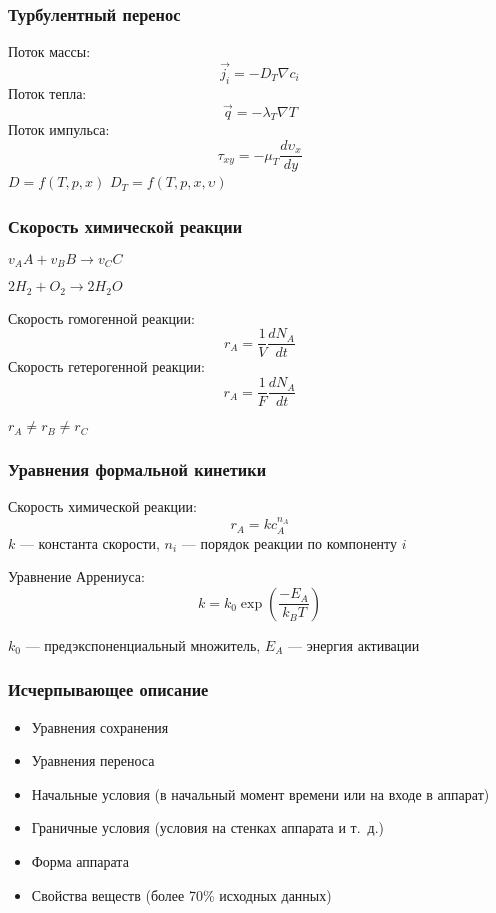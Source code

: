 \begin{frame}
	\frametitle{Турбулентный перенос}
	Поток массы:
	\begin{equation}
	\vec{j_i} = -D_{T}\nabla c_i
	\end{equation}
	Поток тепла:
	\begin{equation}
	\vec{q} = -\lambda_T \nabla T
	\end{equation}
	Поток импульса:
	\begin{equation}
	\tau_{xy} = -\mu_T \dfrac{d \upsilon_x}{d y}
	\end{equation}
	$D=f(T,p,x)$ $D_T=f(T,p,x,\upsilon)$
	
\end{frame}


\begin{frame}
\frametitle{Скорость химической реакции}
$v_A A + v_B B \rightarrow v_C C$

$2 H_2 + O_2 \rightarrow  2 H_2 O$

Скорость гомогенной реакции:
	\begin{equation}
		r_A = \dfrac{1}{V} \dfrac{d N_A}{d t}
	\end{equation}
Скорость гетерогенной реакции:
	\begin{equation}
		r_A = \dfrac{1}{F} \dfrac{d N_A}{d t}
	\end{equation}
	
	$r_A \ne r_B \ne r_C$
\end{frame}

\begin{frame}
\frametitle{Уравнения формальной кинетики}
Скорость химической реакции:
\begin{equation}
r_A = k c_A^{n_A}
\end{equation}
$k$ --- константа скорости, $n_i$ --- порядок реакции по компоненту $i$

Уравнение Аррениуса:
\begin{equation}
k=k_0 \exp \left( \dfrac{-E_A}{k_B T} \right)
\end{equation}

$k_0$ --- предэкспоненциальный множитель, $E_A$ --- энергия активации
\end{frame}

\begin{frame}
\frametitle{Исчерпывающее описание}
\begin{itemize}
\item Уравнения сохранения
\item Уравнения переноса
\item Начальные условия (в начальный момент времени или на входе в аппарат)
\item Граничные условия (условия на стенках аппарата и т. д.)
\item Форма аппарата
\item Свойства веществ (более 70\% исходных данных) 
\end{itemize}

\end{frame}

